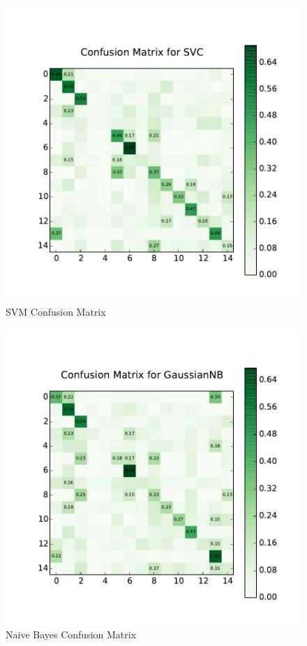 \begin{figure}
\centering
\includegraphics[width=\linewidth]{images/baseline/cm_svm.pdf}
\caption{SVM Confusion Matrix}
\label{svm}
\end{figure}
\begin{figure}
\centering
\includegraphics[width=\linewidth]{images/baseline/cm_naive_bayes.pdf}
\caption{Naive Bayes Confusion Matrix}
\label{naive_bayes}
\end{figure}

